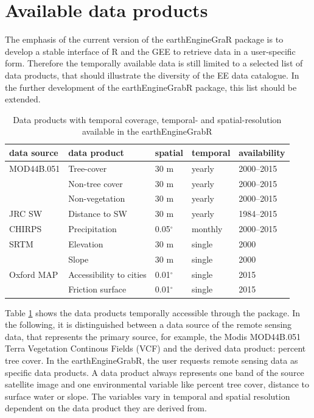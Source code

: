 \section{Available data products}

The emphasis of the current version of the earthEngineGraR package is to develop a stable interface of R and the GEE to retrieve data in a user-specific form. Therefore the temporally available data is still limited to a selected list of data products, that should illustrate the diversity of the EE data catalogue. In the further development of the earthEngineGrabR package, this list should be extended.

\begin{table}[h]
	\begin{tabularx}{\textwidth}{|l|l|X|X|X|}
		\hline
		\textbf{data source} & \textbf{data product} & \textbf{spatial} & \textbf{temporal} & \textbf{availability}\\
		\hline
		
		MOD44B.051 & Tree-cover  & 30 m & yearly & 2000–2015 \\
		
		& Non-tree cover  & 30 m & yearly & 2000–2015 \\
		
		& Non-vegetation  & 30 m & yearly & 2000–2015 \\
		
		JRC SW  & Distance to SW & 30 m & yearly & 1984–2015 \\
		
		CHIRPS & Precipitation & 0.05$^\circ$ & monthly & 2000–2015\\
		
		SRTM & Elevation  & 30 m & single & 2000\\
		& Slope  & 30 m & single & 2000\\
		
		Oxford MAP & Accessibility to cities  & 0.01$^\circ$ & single & 2015\\
		
		& Friction surface  & 0.01$^\circ$  & single & 2015\\
		
		\hline
	\end{tabularx}
	\caption{Data products with temporal coverage, temporal- and spatial-resolution available in the earthEngineGrabR}
	\label{data}
\end{table}

Table \ref{data} shows the data products temporally accessible through the package. In the following, it is distinguished between a data source of the remote sensing data, that represents the primary source, for example, the Modis MOD44B.051 Terra Vegetation Continous Fields (VCF) and the derived data product: percent tree cover. In the earthEngineGrabR, the user requests remote sensing data as specific data products. A data product always represents one band of the source satellite image and one environmental variable like percent tree cover, distance to surface water or slope.
The variables vary in temporal and spatial resolution dependent on the data product they are derived from. 

